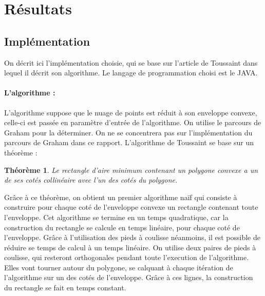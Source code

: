 \documentclass[12pt]{report}
\newtheorem{theoremA}{Théorème}
\begin{document}
\section{Résultats}
\subsection{Implémentation}
On décrit ici l'implémentation choisie, qui se base sur l'article de Toussaint dans lequel il décrit son algorithme. Le langage de programmation choisi est le JAVA.
\paragraph{L'algorithme : }
L'algorithme suppose que le nuage de points est réduit à son enveloppe convexe, celle-ci est passée en paramètre d'entrée de l'algorithme. On utilise le parcours de Graham pour la déterminer. On ne se concentrera pas sur l'implémentation du parcours de Graham dans ce rapport. L'algorithme de Toussaint se base sur un théorème : 
\begin{theoremA}Le rectangle d'aire minimum contenant un polygone convexe a un de ses cotés collinéaire avec l'un des cotés du polygone.
\end{theoremA}
Grâce à ce théorème, on obtient un premier algorithme naïf qui consiste à construire pour chaque coté de l'enveloppe convexe un rectangle contenant toute l'enveloppe. Cet algorithme se termine en un temps quadratique, car la construction du rectangle se calcule en temps linéaire, pour chaque coté de l'enveloppe. Grâce à l'utilisation des pieds à coulisse néanmoins, il est possible de réduire se temps de calcul à un temps linéaire. 
On utilise deux paires de pieds à coulisse, qui resteront orthogonales pendant toute l'execution de l'algorithme. Elles vont tourner autour du polygone, se calquant à chaque itération de l'algorithme  sur un des cotés de l'enveloppe. Grâce à ces lignes, la construction du rectangle se fait en temps constant. 
\end{document}
